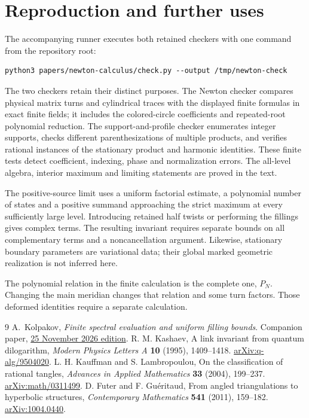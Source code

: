 \section{Reproduction and further uses}\label{nt:reproduction}
The accompanying runner executes both retained checkers with one command
from the repository root:
\begin{verbatim}
python3 papers/newton-calculus/check.py --output /tmp/newton-check
\end{verbatim}
The two checkers retain their distinct purposes.
The Newton checker compares physical matrix turns and cylindrical
traces with the displayed finite formulas in exact finite fields;
it includes the colored-circle coefficients and repeated-root
polynomial reduction. The support-and-profile checker enumerates
integer supports, checks different parenthesizations of multiple
products, and verifies rational instances of the stationary product
and harmonic identities. These finite tests detect coefficient,
indexing, phase and normalization errors. The all-level algebra,
interior maximum and limiting statements are proved in the text.

The positive-source limit uses a uniform factorial estimate, a
polynomial number of states and a positive summand approaching the
strict maximum at every sufficiently large level. Introducing retained
half twists or performing the fillings gives complex terms. The
resulting invariant requires separate bounds on all complementary
terms and a noncancellation argument. Likewise, stationary boundary
parameters are variational data; their global marked geometric
realization is not inferred here.

The polynomial relation in the finite calculation is the complete
one, $P_N$. Changing the main meridian changes that relation and some
turn factors. Those deformed identities require a separate calculation.

\begin{thebibliography}{9}
A.~Kolpakov, \emph{Finite spectral evaluation and uniform filling bounds}.
Companion paper, \href{https://github.com/sashakolpakov/murakamis_dream/blob/conway-series-2026-11-25/docs/papers/filling-bounds.pdf}{25 November 2026 edition}.
 R. M. Kashaev,
A link invariant from quantum dilogarithm,
\emph{Modern Physics Letters A} \textbf{10} (1995), 1409--1418.
\href{https://arxiv.org/abs/q-alg/9504020}{arXiv:q-alg/9504020}.
 L. H. Kauffman and S. Lambropoulou,
On the classification of rational tangles,
\emph{Advances in Applied Mathematics} \textbf{33} (2004), 199--237.
\href{https://arxiv.org/abs/math/0311499}{arXiv:math/0311499}.
 D. Futer and F. Gu\'eritaud,
From angled triangulations to hyperbolic structures,
\emph{Contemporary Mathematics} \textbf{541} (2011), 159--182.
\href{https://arxiv.org/abs/1004.0440}{arXiv:1004.0440}.
\end{thebibliography}

